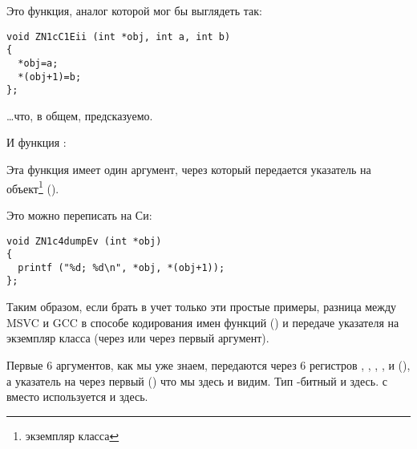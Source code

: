 Это функция, аналог которой мог бы выглядеть так:

\begin{lstlisting}[style=customc]
void ZN1cC1Eii (int *obj, int a, int b)
{
  *obj=a;
  *(obj+1)=b;
};
\end{lstlisting}

\dots что, в общем, предсказуемо.

И функция :



Эта функция  имеет один аргумент, через который передается указатель на 
объект\footnote{экземпляр класса} (\ITthis).

Это можно переписать на Си:

\begin{lstlisting}[style=customc]
void ZN1c4dumpEv (int *obj)
{
  printf ("%d; %d\n", *obj, *(obj+1));
};
\end{lstlisting}

Таким образом, если брать в учет только эти простые примеры, разница между MSVC и GCC 
в способе кодирования имен функций () и передаче указателя на экземпляр класса 
(через \ECX или через первый аргумент).


Первые 6 аргументов, как мы уже знаем, передаются через 6 регистров \RDI, \RSI, \RDX, \RCX,  и 
 (\SysVABI), а указатель на \ITthis через первый (\RDI) что мы здесь и видим.
Тип -битный и здесь.
 с \JMP вместо \RET используется и здесь.



